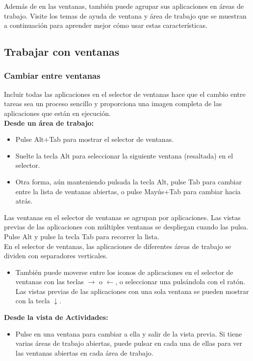 Además de en las ventanas, también puede agrupar sus aplicaciones en áreas de trabajo. Visite los temas de ayuda de ventana y área de trabajo que se muestran a continuación para aprender mejor cómo usar estas características.

\subsection{Trabajar con ventanas}
\subsubsection{Cambiar entre ventanas}
Incluir todas las aplicaciones en el selector de ventanas hace que el cambio entre tareas sea un proceso sencillo y proporciona una imagen completa de las aplicaciones que están en ejecución.\\

{\bf Desde un área de trabajo:}
\begin{itemize}
\item Pulse Alt+Tab para mostrar el selector de ventanas.
\item Suelte la tecla Alt para seleccionar la siguiente ventana (resaltada) en el selector.
\item Otra forma, aún manteniendo pulsada la tecla Alt, pulse Tab para cambiar entre la lista de ventanas abiertas, o pulse Mayús+Tab para cambiar hacia atrás.
\end{itemize}
Las ventanas en el selector de ventanas se agrupan por aplicaciones. Las vistas previas de las aplicaciones con múltiples ventanas se despliegan cuando las pulsa. Pulse Alt y pulse la tecla Tab para recorrer la lista.\\
En el selector de ventanas, las aplicaciones de diferentes áreas de trabajo se dividen con separadores verticales.

\begin{itemize}
\item También puede moverse entre los iconos de aplicaciones en el selector de ventanas con las teclas $→$ o $←$, o seleccionar una pulsándola con el ratón.\\
Las vistas previas de las aplicaciones con una sola ventana se pueden mostrar con la tecla $↓$.
\end{itemize}
{\bf Desde la vista de Actividades:}
\begin{itemize}
\item Pulse en una ventana para cambiar a ella y salir de la vista previa. Si tiene varias áreas de trabajo abiertas, puede pulsar en cada una de ellas para ver las ventanas abiertas en cada área de trabajo.
\end{itemize}
